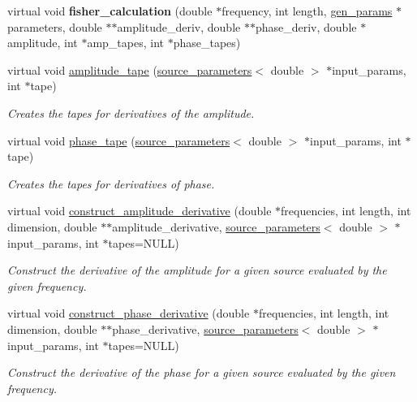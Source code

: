 \begin{DoxyCompactItemize}
virtual void {\bfseries fisher\+\_\+calculation} (double $\ast$frequency, int length, \hyperlink{structgen__params}{gen\+\_\+params} $\ast$parameters, double $\ast$$\ast$amplitude\+\_\+deriv, double $\ast$$\ast$phase\+\_\+deriv, double $\ast$amplitude, int $\ast$amp\+\_\+tapes, int $\ast$phase\+\_\+tapes)
\item 
virtual void \hyperlink{classppE__IMRPhenomD__IMR_a3119a07c11ed53ae94823b11c5234c4f}{amplitude\+\_\+tape} (\hyperlink{structsource__parameters}{source\+\_\+parameters}$<$ double $>$ $\ast$input\+\_\+params, int $\ast$tape)
\begin{DoxyCompactList}\small\item\em Creates the tapes for derivatives of the amplitude. \end{DoxyCompactList}\item 
virtual void \hyperlink{classppE__IMRPhenomD__IMR_acf2ed8617b3e24ecc273a409ff579ce4}{phase\+\_\+tape} (\hyperlink{structsource__parameters}{source\+\_\+parameters}$<$ double $>$ $\ast$input\+\_\+params, int $\ast$tape)
\begin{DoxyCompactList}\small\item\em Creates the tapes for derivatives of phase. \end{DoxyCompactList}\item 
virtual void \hyperlink{classppE__IMRPhenomD__IMR_a5b80e5ae4dd83da49beb15e6e5f17715}{construct\+\_\+amplitude\+\_\+derivative} (double $\ast$frequencies, int length, int dimension, double $\ast$$\ast$amplitude\+\_\+derivative, \hyperlink{structsource__parameters}{source\+\_\+parameters}$<$ double $>$ $\ast$input\+\_\+params, int $\ast$tapes=N\+U\+LL)
\begin{DoxyCompactList}\small\item\em Construct the derivative of the amplitude for a given source evaluated by the given frequency. \end{DoxyCompactList}\item 
virtual void \hyperlink{classppE__IMRPhenomD__IMR_a78151d1f34693b69cf6ccbc28df4caa6}{construct\+\_\+phase\+\_\+derivative} (double $\ast$frequencies, int length, int dimension, double $\ast$$\ast$phase\+\_\+derivative, \hyperlink{structsource__parameters}{source\+\_\+parameters}$<$ double $>$ $\ast$input\+\_\+params, int $\ast$tapes=N\+U\+LL)
\begin{DoxyCompactList}\small\item\em Construct the derivative of the phase for a given source evaluated by the given frequency. \end{DoxyCompactList}\end{DoxyCompactItemize}


